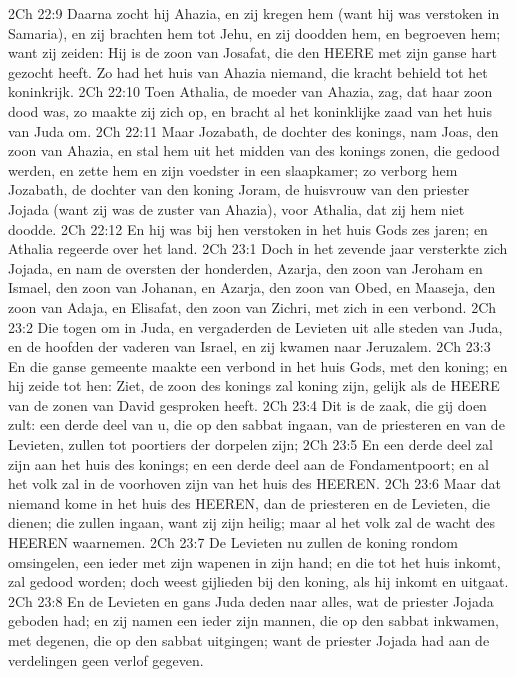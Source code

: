 2Ch 22:9  Daarna zocht hij Ahazia, en zij kregen hem (want hij was verstoken in Samaria), en zij brachten hem tot Jehu, en zij doodden hem, en begroeven hem; want zij zeiden: Hij is de zoon van Josafat, die den HEERE met zijn ganse hart gezocht heeft. Zo had het huis van Ahazia niemand, die kracht behield tot het koninkrijk.
2Ch 22:10  Toen Athalia, de moeder van Ahazia, zag, dat haar zoon dood was, zo maakte zij zich op, en bracht al het koninklijke zaad van het huis van Juda om.
2Ch 22:11  Maar Jozabath, de dochter des konings, nam Joas, den zoon van Ahazia, en stal hem uit het midden van des konings zonen, die gedood werden, en zette hem en zijn voedster in een slaapkamer; zo verborg hem Jozabath, de dochter van den koning Joram, de huisvrouw van den priester Jojada (want zij was de zuster van Ahazia), voor Athalia, dat zij hem niet doodde.
2Ch 22:12  En hij was bij hen verstoken in het huis Gods zes jaren; en Athalia regeerde over het land.
2Ch 23:1  Doch in het zevende jaar versterkte zich Jojada, en nam de oversten der honderden, Azarja, den zoon van Jeroham en Ismael, den zoon van Johanan, en Azarja, den zoon van Obed, en Maaseja, den zoon van Adaja, en Elisafat, den zoon van Zichri, met zich in een verbond.
2Ch 23:2  Die togen om in Juda, en vergaderden de Levieten uit alle steden van Juda, en de hoofden der vaderen van Israel, en zij kwamen naar Jeruzalem.
2Ch 23:3  En die ganse gemeente maakte een verbond in het huis Gods, met den koning; en hij zeide tot hen: Ziet, de zoon des konings zal koning zijn, gelijk als de HEERE van de zonen van David gesproken heeft.
2Ch 23:4  Dit is de zaak, die gij doen zult: een derde deel van u, die op den sabbat ingaan, van de priesteren en van de Levieten, zullen tot poortiers der dorpelen zijn;
2Ch 23:5  En een derde deel zal zijn aan het huis des konings; en een derde deel aan de Fondamentpoort; en al het volk zal in de voorhoven zijn van het huis des HEEREN.
2Ch 23:6  Maar dat niemand kome in het huis des HEEREN, dan de priesteren en de Levieten, die dienen; die zullen ingaan, want zij zijn heilig; maar al het volk zal de wacht des HEEREN waarnemen.
2Ch 23:7  De Levieten nu zullen de koning rondom omsingelen, een ieder met zijn wapenen in zijn hand; en die tot het huis inkomt, zal gedood worden; doch weest gijlieden bij den koning, als hij inkomt en uitgaat.
2Ch 23:8  En de Levieten en gans Juda deden naar alles, wat de priester Jojada geboden had; en zij namen een ieder zijn mannen, die op den sabbat inkwamen, met degenen, die op den sabbat uitgingen; want de priester Jojada had aan de verdelingen geen verlof gegeven.
